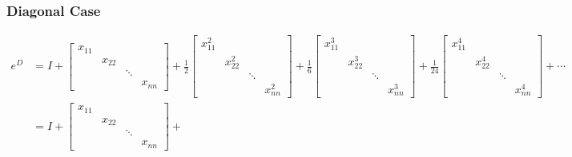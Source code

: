 \subsubsection{Diagonal Case}
\begin{align*}
    e^{D} & = I +
    \begin{bmatrix}
        x_{11} &        &        &        \\
               & x_{22} &        &        \\
               &        & \ddots &        \\
               &        &        & x_{nn}
    \end{bmatrix} + \frac{1}{2}
    \begin{bmatrix}
        x_{11}^{2} &            &        &            \\
                   & x_{22}^{2} &        &            \\
                   &            & \ddots &            \\
                   &            &        & x_{nn}^{2}
    \end{bmatrix}  + \frac{1}{6}
    \begin{bmatrix}
        x_{11}^{3} &            &        &            \\
                   & x_{22}^{3} &        &            \\
                   &            & \ddots &            \\
                   &            &        & x_{nn}^{3}
    \end{bmatrix} + \frac{1}{24}
    \begin{bmatrix}
        x_{11}^{4} &            &        &            \\
                   & x_{22}^{4} &        &            \\
                   &            & \ddots &            \\
                   &            &        & x_{nn}^{4}
    \end{bmatrix} + \cdots                                    \\
          & = I + \begin{bmatrix}
        x_{11} &        &        &        \\
               & x_{22} &        &        \\
               &        & \ddots &        \\
               &        &        & x_{nn}
    \end{bmatrix} +

\end{align*}
